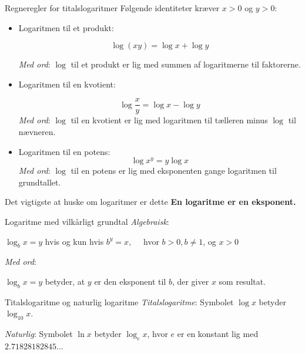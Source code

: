 \begin{custombox}{Regneregler for titalslogaritmer}
Følgende identiteter kræver $x>0$ og $y>0$:
\begin{itemize}
    \item Logaritmen til et produkt:
    
    \[
    \log(xy)=\log x+\log y
    \]
    
    \textit{Med ord}: $\log$ til et produkt er lig med summen af logaritmerne til faktorerne.
    \vspace{0.2cm}
    \item Logaritmen til en kvotient:
    
    \[
    \log \frac{x}{y}=\log x-\log y
    \]
    \vspace{0.1cm}
    \textit{Med ord}: $\log$ til en kvotient er lig med logaritmen til tælleren minus $\log$ til nævneren.
    \vspace{0.2cm}
    \item Logaritmen til en potens:
    \[
    \log x^y=y \log x
    \]
    \textit{Med ord}: $\log$ til en potens er lig med eksponenten gange logaritmen til grundtallet.
\end{itemize}

   
\end{custombox}

\begin{custombox}{Det vigtigste at huske om logaritmer er dette}
    \textbf{En logaritme er en eksponent.}
\end{custombox}

\begin{definition}{Logaritme med vilkårligt grundtal}
\textit{Algebraisk}:

\hspace{1cm}$\log _b x=y$ hvis og kun hvis $b^y=x, \quad$ hvor $b>0, b \neq 1$, og $x>0$

\vspace{0.3cm}

\textit{Med ord}:

\hspace{1cm} $\log _b x=y$ betyder, at $y$ er den eksponent til $b$, der giver $x$ som resultat.
    
\end{definition}

\begin{definition}{Titalslogaritme og naturlig logaritme}
\hspace{1cm} \textit{Titalslogaritme}: Symbolet $\log x$ betyder $\log _{10} x$.

\hspace{1cm}  \textit{Naturlig}: \hspace{0.2cm}Symbolet $\ln x$ betyder $\log _e x$, hvor $e$ er en konstant lig med $2.71828182845 \ldots$
\end{definition}

